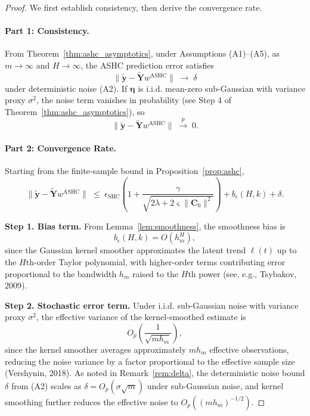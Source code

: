 \documentclass{article}
\begin{document}
\begin{proof}
We first establish consistency, then derive the convergence rate.

\paragraph{Part 1: Consistency.}
From Theorem~\ref{thm:ashc_asymptotics}, under Assumptions (A1)--(A5), as $m \to \infty$ and $H \to \infty$, the ASHC prediction error satisfies
\[
\|\widetilde{\mathbf{y}} - \widetilde{\mathbf{Y}} w^{\text{ASHC}}\| \;\longrightarrow\; \delta
\]
under deterministic noise (A2). If $\bm{\eta}$ is i.i.d. mean-zero sub-Gaussian with variance proxy $\sigma^2$, the noise term vanishes in probability (see Step 4 of Theorem~\ref{thm:ashc_asymptotics}), so
\[
\|\widetilde{\mathbf{y}} - \widetilde{\mathbf{Y}} w^{\text{ASHC}}\| \;\xrightarrow{p}\; 0.
\]

\paragraph{Part 2: Convergence Rate.}
Starting from the finite-sample bound in Proposition~\ref{prop:ashc},
\begin{equation}
\label{eq:bound_rate}
\|\widetilde{\mathbf{y}} - \widetilde{\mathbf{Y}} w^{\text{ASHC}}\|
\;\leq\;
\epsilon_{\text{SHC}}
\left(1 + \frac{\gamma}{\sqrt{2\lambda + 2\varsigma \|\mathbf{C}_0\|^2}}\right)
+ b_\epsilon(H,k) + \delta.
\end{equation}

\textbf{Step 1. Bias term.}
From Lemma~\ref{lem:smoothness}, the smoothness bias is
\[
b_\epsilon(H,k) = O\!\left(h_m^H\right),
\]
since the Gaussian kernel smoother approximates the latent trend $\ell(t)$ up to the $H$th-order Taylor polynomial, with higher-order terms contributing error proportional to the bandwidth $h_m$ raised to the $H$th power (see, e.g., Tsybakov, 2009).

\textbf{Step 2. Stochastic error term.}
Under i.i.d. sub-Gaussian noise with variance proxy $\sigma^2$, the effective variance of the kernel-smoothed estimate is
\[
O_p\!\left(\frac{1}{\sqrt{m h_m}}\right),
\]
since the kernel smoother averages approximately $m h_m$ effective observations, reducing the noise variance by a factor proportional to the effective sample size (Vershynin, 2018). As noted in Remark~\ref{rem:delta}, the deterministic noise bound $\delta$ from (A2) scales as $\delta = O_p(\sigma \sqrt{m})$ under sub-Gaussian noise, and kernel smoothing further reduces the effective noise to $O_p((m h_m)^{-1/2})$.


\end{proof}
\end{document}

